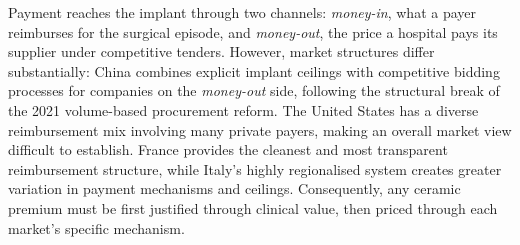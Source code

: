 \documentclass{article}
\begin{document}
Payment reaches the implant through two channels: \emph{money-in}, what a payer reimburses for the surgical episode, and \emph{money-out}, the price a hospital pays its supplier under competitive tenders. However, market structures differ substantially: China combines explicit implant ceilings with competitive bidding processes for companies on the \emph{money-out} side, following the structural break of the 2021 volume-based procurement reform. The United States has a diverse reimbursement mix involving many private payers, making an overall market view difficult to establish. France provides the cleanest and most transparent reimbursement structure, while Italy's highly regionalised system creates greater variation in payment mechanisms and ceilings. Consequently, any ceramic premium must be first justified through clinical value, then priced through each market's specific mechanism.


\small
\setlength{\tabcolsep}{3pt}
\renewcommand{\arraystretch}{1.15}
\end{document}
